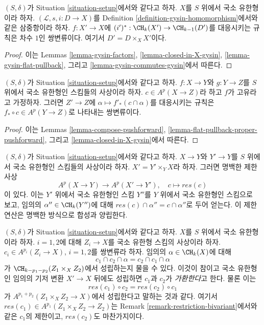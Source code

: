 \begin{lemma}
\label{lemma-gysin-bivariant}
$(S, \delta)$가 Situation \ref{situation-setup}에서와 같다고 하자.
$X$를 $S$ 위에서 국소 유한형이라 하자.
$(\mathcal{L}, s, i : D \to X)$를 Definition
\ref{definition-gysin-homomorphism}에서와 같은 삼중항이라 하자.
$f : X' \to X$에 $(i')^* : \CH_k(X') \to \CH_{k - 1}(D')$를
대응시키는 규칙은 차수 $1$인 쌍변류이다. 여기서
$D' = D \times_X X'$이다.
\end{lemma}

\begin{proof}
이는 Lemmas \ref{lemma-gysin-factors},
\ref{lemma-closed-in-X-gysin},
\ref{lemma-gysin-flat-pullback}, 그리고
\ref{lemma-gysin-commutes-gysin}에서 따른다.
\end{proof}

\begin{lemma}
\label{lemma-push-proper-bivariant}
$(S, \delta)$가 Situation \ref{situation-setup}에서와 같다고 하자.
$f : X \to Y$와 $g : Y \to Z$를 $S$ 위에서 국소 유한형인 스킴들의
사상이라 하자. $c \in A^p(X \to Z)$라 하고 $f$가 고유라고 가정하자.
그러면 $Z' \to Z$에 $\alpha \longmapsto f'_*(c \cap \alpha)$를
대응시키는 규칙은 $f_* \circ c \in A^p(Y \to Z)$로 나타내는
쌍변류이다.
\end{lemma}

\begin{proof}
이는 Lemmas \ref{lemma-compose-pushforward},
\ref{lemma-flat-pullback-proper-pushforward}, 그리고
\ref{lemma-closed-in-X-gysin}에서 따른다.
\end{proof}

\begin{remark}
\label{remark-restriction-bivariant}
$(S, \delta)$가 Situation \ref{situation-setup}에서와 같다고 하자.
$X \to Y$와 $Y' \to Y$를 $S$ 위에서 국소 유한형인 스킴들의 사상이라
하자. $X' = Y' \times_Y X$라 하자. 그러면 명백한 제한 사상
$$
A^p(X \to Y) \longrightarrow A^p(X' \to Y'),\quad
c \longmapsto res(c)
$$
이 있다. 이는 $Y'$ 위에서 국소 유한형인 스킴 $Y''$를 $Y$ 위에서
국소 유한형인 스킴으로 보고, 임의의 $\alpha'' \in \CH_k(Y'')$에 대해
$res(c) \cap \alpha'' = c \cap \alpha''$로 두어 얻는다. 이 제한 연산은
명백한 방식으로 합성과 양립한다.
\end{remark}

\begin{remark}
\label{remark-bivariant-commute}
$(S, \delta)$가 Situation \ref{situation-setup}에서와 같다고 하자.
$X$를 $S$ 위에서 국소 유한형이라 하자. $i = 1, 2$에 대해
$Z_i \to X$를 국소 유한형 스킴의 사상이라 하자.
$c_i \in A^{p_i}(Z_i \to X)$, $i = 1, 2$를 쌍변류라 하자. 임의의
$\alpha \in \CH_k(X)$에 대해
$$
c_1 \cap c_2 \cap \alpha = c_2 \cap c_1 \cap \alpha
$$
가 $\CH_{k - p_1 - p_2}(Z_1 \times_X Z_2)$에서 성립하는지 물을 수 있다.
이것이 참이고 국소 유한형인 임의의 기저 변환 $X' \to X$ 뒤에도
성립하면 $c_1$과 $c_2$가 {\it 가환한다}고 한다. 물론 이는
$$
res(c_1) \circ c_2 = res(c_2) \circ c_1
$$
가 $A^{p_1 + p_2}(Z_1 \times_X Z_2 \to X)$에서 성립한다고 말하는 것과
같다. 여기서
$res(c_1) \in A^{p_1}(Z_1 \times_X Z_2 \to Z_2)$는 Remark
\ref{remark-restriction-bivariant}에서와 같은 $c_1$의 제한이고,
$res(c_2)$도 마찬가지이다.
\end{remark}

